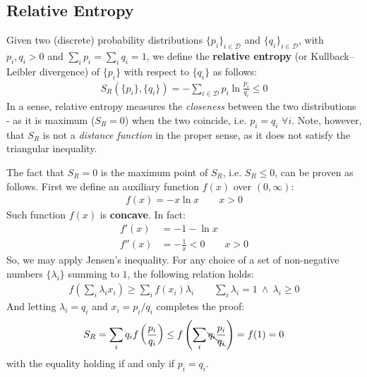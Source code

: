 \documentclass[../template.tex]{subfiles}
\begin{document}
\subsection{Relative Entropy}
Given two (discrete) probability distributions $\{p_i\}_{i \in \mathcal{D}}$ and $\{q_i\}_{i \in \mathcal{D}}$, with $p_i, q_i > 0$ and $\sum_i p_i = \sum_i q_i = 1$, we define the \textbf{relative entropy} (or Kullback–Leibler divergence) of $\{p_i\}$ with respect to $\{q_i\}$ as follows:
\begin{align}
    S_R(\{p_i\}, \{q_i\}) = -\sum_{i \in \mathcal{D}} p_i \ln \frac{p_i}{q_i} \leq 0 \label{eqn:relative-entropy}
\end{align}  
In a sense, relative entropy measures the \textit{closeness} between the two distributions - as it is maximum ($S_R=0$) when the two coincide, i.e. $p_i = q_i$ $\forall i$. Note, however, that $S_R$ is not a \textit{distance function} in the proper sense, as it does not satisfy the triangular inequality. 

\medskip

The fact that $S_R=0$ is the maximum point of $S_R$, i.e. $S_R \leq 0$, can be proven as follows. First we define an auxiliary function $f(x)$ over $(0,\infty)$:
\begin{align*}
    f(x) = -x \ln x \qquad x > 0
\end{align*}
Such function $f(x)$ is \textbf{concave}. In fact: 
\begin{align*}
    f'(x) &= -1 - \ln x\\
    f''(x) &= -\frac{1}{x}  < 0 \qquad x > 0
\end{align*}
So, we may apply Jensen's inequality. For any choice of a set of non-negative numbers $\{\lambda_i\}$ summing to $1$, the following relation holds: %
\begin{align*}
    f\left(\sum_i \lambda_i x_i\right) \geq \sum_i f(x_i) \lambda_i \qquad \sum_i \lambda_i = 1 \> \land \> \lambda_i \geq 0
\end{align*}
And letting $\lambda_i = q_i$ and $x_i = p_i / q_i$ completes the proof:
\begin{align*}
    S_R = \sum_i q_i f\left(\frac{p_i}{q_i} \right) \leq f\left(\sum_i \bcancel{q_i} \frac{p_i}{\bcancel{q_i}} \right) = f(1) = 0
\end{align*}
with the equality holding if and only if $p_i = q_i$.
\end{document}
